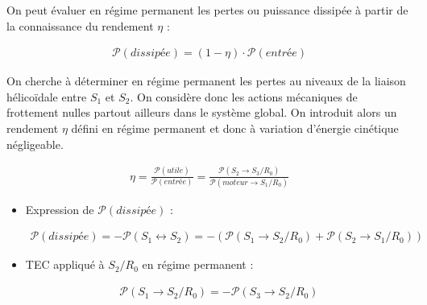 \documentclass[a4paper,10pt]{article}
\begin{document}
\begin{propriete}
On peut évaluer en régime permanent les pertes ou puissance dissipée à partir de la connaissance du rendement $\eta$ : 

\begin{align}
\boxed{
\mathcal{P}(dissipée)=(1-\eta)\cdot \mathcal{P}(entrée)
}
\end{align}



\end{propriete}

\begin{exemple}
On cherche à déterminer en régime permanent les pertes au niveaux de la liaison hélicoïdale entre $S_1$ et $S_2$. On considère donc les actions mécaniques de frottement nulles partout ailleurs dans le système global. On introduit alors un rendement $\eta$ défini en régime permanent et donc à variation d'énergie cinétique négligeable.


\begin{texteCache}
\begin{align*}
\eta=\frac{\mathcal{P}(utile)}{\mathcal{P}(entrée)}=\frac{\mathcal{P}(S_2\to S_3/R_0)}{\mathcal{P}(moteur\to S_1/R_0)}
\end{align*}
\end{texteCache}


\begin{itemize}
\item Expression de $\mathcal{P}(dissipée)$ :
\begin{texteCache}
\begin{align*}
\mathcal{P}(dissipée)=-\mathcal{P}(S_1\leftrightarrow S_2)=-\left(\mathcal{P}(S_1\to S_2/R_0)+\mathcal{P}(S_2\to S_1/R_0)\right)
\end{align*}
\end{texteCache}
\item TEC appliqué à $S_2/R_0$ en régime permanent : 
\begin{texteCache}
\begin{align*}
\mathcal{P}(S_1\to S_2/R_0)=-\mathcal{P}(S_3\to S_2/R_0)
\end{align*}
\end{texteCache}


\end{itemize}
\end{exemple}
\end{document}
